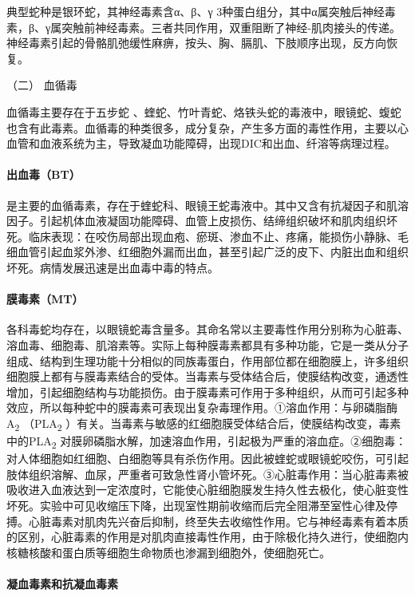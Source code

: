 典型蛇种是银环蛇，其神经毒素含α、β、γ
3种蛋白组分，其中α属突触后神经毒素，β、γ属突触前神经毒素。三者共同作用，双重阻断了神经-肌肉接头的传递。神经毒素引起的骨骼肌弛缓性麻痹，按头、胸、膈肌、下肢顺序出现，反方向恢复。

\hypertarget{text00172.htmlux5cux23CHP5-8-1-1-3-2}{}
（二） 血循毒

血循毒主要存在于五步蛇
、蝰蛇、竹叶青蛇、烙铁头蛇的毒液中，眼镜蛇、蝮蛇也含有此毒素。血循毒的种类很多，成分复杂，产生多方面的毒性作用，主要以心血管和血液系统为主，导致凝血功能障碍，出现DIC和出血、纤溶等病理过程。

\paragraph{出血毒（BT）}

是主要的血循毒素，存在于蝰蛇科、眼镜王蛇毒液中。其中又含有抗凝因子和肌溶因子。引起机体血液凝固功能障碍、血管上皮损伤、结缔组织破坏和肌肉组织坏死。临床表现：在咬伤局部出现血疱、瘀斑、渗血不止、疼痛，能损伤小静脉、毛细血管引起血浆外渗、红细胞外漏而出血，甚至引起广泛的皮下、内脏出血和组织坏死。病情发展迅速是出血毒中毒的特点。

\paragraph{膜毒素（MT）}

各科毒蛇均存在，以眼镜蛇毒含量多。其命名常以主要毒性作用分别称为心脏毒、溶血毒、细胞毒、肌溶素等。实际上每种膜毒素都具有多种功能，它是一类从分子组成、结构到生理功能十分相似的同族毒蛋白，作用部位都在细胞膜上，许多组织细胞膜上都有与膜毒素结合的受体。当毒素与受体结合后，使膜结构改变，通透性增加，引起细胞结构与功能损伤。由于膜毒素可作用于多种组织，从而可引起多种效应，所以每种蛇中的膜毒素可表现出复杂毒理作用。①溶血作用：与卵磷脂酶A\textsubscript{2}
（PLA\textsubscript{2}
）有关。当毒素与敏感的红细胞膜受体结合后，使膜结构改变，毒素中的PLA\textsubscript{2}
对膜卵磷脂水解，加速溶血作用，引起极为严重的溶血症。②细胞毒：对人体细胞如红细胞、白细胞等具有杀伤作用。因此被蝰蛇或眼镜蛇咬伤，可引起肢体组织溶解、血尿，严重者可致急性肾小管坏死。③心脏毒作用：当心脏毒素被吸收进入血液达到一定浓度时，它能使心脏细胞膜发生持久性去极化，使心脏变性坏死。实验中可见收缩压下降，出现室性期前收缩而后完全阻滞至室性心律及停搏。心脏毒素对肌肉先兴奋后抑制，终至失去收缩性作用。它与神经毒素有着本质的区别，心脏毒素的作用是对肌肉直接毒性作用，由于除极化持久进行，使细胞内核糖核酸和蛋白质等细胞生命物质也渗漏到细胞外，使细胞死亡。

\paragraph{凝血毒素和抗凝血毒素}

